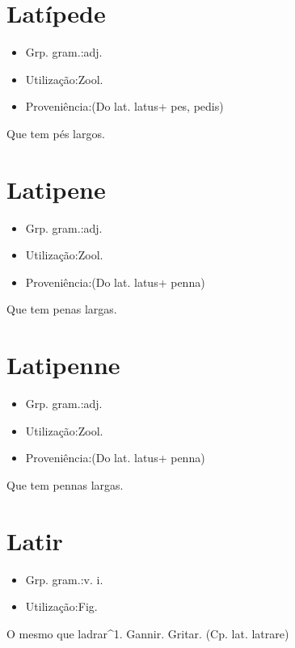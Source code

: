 \section{Latípede}
\begin{itemize}
\item {Grp. gram.:adj.}
\end{itemize}
\begin{itemize}
\item {Utilização:Zool.}
\end{itemize}
\begin{itemize}
\item {Proveniência:(Do lat. \textunderscore latus\textunderscore  + \textunderscore pes\textunderscore , \textunderscore pedis\textunderscore )}
\end{itemize}
Que tem pés largos.
\section{Latipene}
\begin{itemize}
\item {Grp. gram.:adj.}
\end{itemize}
\begin{itemize}
\item {Utilização:Zool.}
\end{itemize}
\begin{itemize}
\item {Proveniência:(Do lat. \textunderscore latus\textunderscore  + \textunderscore penna\textunderscore )}
\end{itemize}
Que tem penas largas.
\section{Latipenne}
\begin{itemize}
\item {Grp. gram.:adj.}
\end{itemize}
\begin{itemize}
\item {Utilização:Zool.}
\end{itemize}
\begin{itemize}
\item {Proveniência:(Do lat. \textunderscore latus\textunderscore  + \textunderscore penna\textunderscore )}
\end{itemize}
Que tem pennas largas.
\section{Latir}
\begin{itemize}
\item {Grp. gram.:v. i.}
\end{itemize}
\begin{itemize}
\item {Utilização:Fig.}
\end{itemize}
O mesmo que \textunderscore ladrar\textunderscore ^1.
Gannir.
Gritar.
(Cp. lat. \textunderscore latrare\textunderscore )
